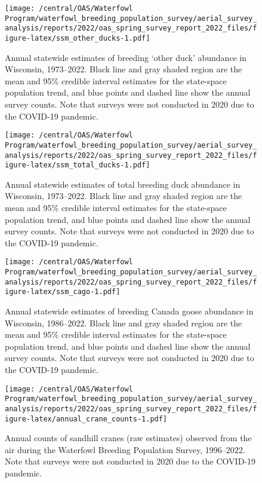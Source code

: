 \documentclass[
  12pt,
]{article}
\begin{document}
\newpage

\begin{figure}
\centering
\texttt{[image: /central/OAS/Waterfowl Program/waterfowl\_breeding\_population\_survey/aerial\_survey\_analysis/reports/2022/oas\_spring\_survey\_report\_2022\_files/figure-latex/ssm\_other\_ducks-1.pdf]}
\caption{\label{fig:ssm_other_ducks}Annual statewide estimates of
breeding `other duck' abundance in Wisconsin, 1973--2022. Black line and
gray shaded region are the mean and 95\% credible interval estimates for
the state-space population trend, and blue points and dashed line show
the annual survey counts. Note that surveys were not conducted in 2020
due to the COVID-19 pandemic.}
\end{figure}

\newpage

\begin{figure}
\centering
\texttt{[image: /central/OAS/Waterfowl Program/waterfowl\_breeding\_population\_survey/aerial\_survey\_analysis/reports/2022/oas\_spring\_survey\_report\_2022\_files/figure-latex/ssm\_total\_ducks-1.pdf]}
\caption{\label{fig:ssm_total_ducks}Annual statewide estimates of total
breeding duck abundance in Wisconsin, 1973--2022. Black line and gray
shaded region are the mean and 95\% credible interval estimates for the
state-space population trend, and blue points and dashed line show the
annual survey counts. Note that surveys were not conducted in 2020 due
to the COVID-19 pandemic.}
\end{figure}

\newpage

\begin{figure}
\centering
\texttt{[image: /central/OAS/Waterfowl Program/waterfowl\_breeding\_population\_survey/aerial\_survey\_analysis/reports/2022/oas\_spring\_survey\_report\_2022\_files/figure-latex/ssm\_cago-1.pdf]}
\caption{\label{fig:ssm_cago}Annual statewide estimates of breeding
Canada goose abundance in Wisconsin, 1986--2022. Black line and gray
shaded region are the mean and 95\% credible interval estimates for the
state-space population trend, and blue points and dashed line show the
annual survey counts. Note that surveys were not conducted in 2020 due
to the COVID-19 pandemic.}
\end{figure}

\newpage

\begin{figure}
\centering
\texttt{[image: /central/OAS/Waterfowl Program/waterfowl\_breeding\_population\_survey/aerial\_survey\_analysis/reports/2022/oas\_spring\_survey\_report\_2022\_files/figure-latex/annual\_crane\_counts-1.pdf]}
\caption{\label{fig:annual_crane_counts}Annual counts of sandhill cranes
(raw estimates) observed from the air during the Waterfowl Breeding
Population Survey, 1996--2022. Note that surveys were not conducted in
2020 due to the COVID-19 pandemic.}
\end{figure}
\end{document}
